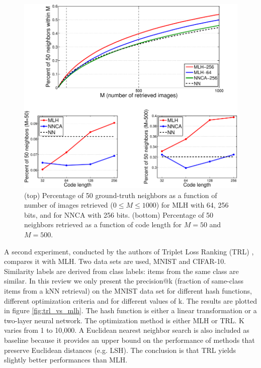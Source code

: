 \begin{figure}
	\includegraphics[width=\textwidth]{img/semantic_search_mlh_nnca.png}
	\caption{(top) Percentage of 50 ground-truth neighbors as a function of number of images retrieved ($0 \leq M \leq 1000$) for MLH with 64, 256 bits, and for NNCA with 256 bits. (bottom) Percentage of 50 neighbors retrieved as a function of code length for $M=50$ and $M=500$. \cite{norouzi2011minimal}}
	\label{fig:semantic_search_mlh_nnca}	
\end{figure}

A second experiment, conducted by the authors of Triplet Loss Ranking (TRL) \cite{norouzi2012hamming}, compares it with MLH. Two data sets are used, MNIST and CIFAR-10. Similarity labels are derived from class labels: items from the same class are similar. In this review we only present the precision@k (fraction of same-class items from a kNN retrieval) on the MNIST data set for different hash functions, different optimization criteria and for different values of k. The results are plotted in figure \ref{fig:trl_vs_mlh}. The hash function is either a linear transformation or a two-layer neural network. The optimization method is either MLH or TRL. K varies from 1 to 10,000. A Euclidean nearest neighbor search is also included as baseline because it provides an upper bound on the performance of methods that preserve Euclidean distances (e.g. LSH). The conclusion is that TRL yields slightly better performances than MLH.

